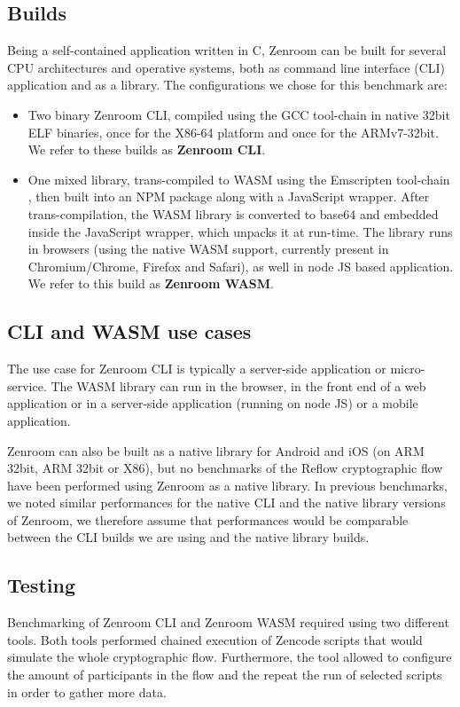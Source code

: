\documentclass[twocolumn]{article}
\begin{document}
\subsection*{Builds} 

Being a self-contained application written in C, Zenroom can be built for several CPU architectures and operative systems, both as command line interface (CLI) application and as a library. The configurations we chose for this benchmark are: 

\begin{itemize}
\item Two binary Zenroom CLI, compiled using the GCC tool-chain in native 32bit ELF binaries, once for the X86-64 platform and once for the ARMv7-32bit. We refer to these builds as \textbf{Zenroom CLI}. 

\item One mixed library, trans-compiled to WASM using the Emscripten tool-chain \citep{zakai2011emscripten}, then built into an NPM package along with a JavaScript wrapper. After trans-compilation, the WASM library is converted to base64 and embedded inside the JavaScript wrapper, which unpacks it at run-time. 
The library runs in browsers (using the native WASM support, currently present in Chromium/Chrome, Firefox and Safari), as well in node JS based application. We refer to this build as \textbf{Zenroom WASM}. 
\end{itemize}

\subsection*{CLI and WASM use cases} 

The use case for Zenroom CLI is typically a server-side application or micro-service. The WASM library can run in the browser, in the front end of a web application or in a server-side application (running on node JS) or a mobile application.

Zenroom can also be built as a native library for Android and iOS (on ARM 32bit, ARM 32bit or X86), but no benchmarks of the Reflow cryptographic flow have been performed using Zenroom as a native library. 
In previous benchmarks, we noted similar performances for the native CLI and the native library versions of Zenroom, we therefore assume that performances would be comparable between the CLI builds we are using and the native library builds.

\subsection*{Testing}
Benchmarking of Zenroom CLI and Zenroom WASM required using two different tools. Both tools performed chained execution of Zencode scripts that would simulate the whole cryptographic flow. Furthermore, the tool allowed to configure the amount of participants in the flow and the repeat the run of selected scripts in order to gather more data.  
\end{document}
